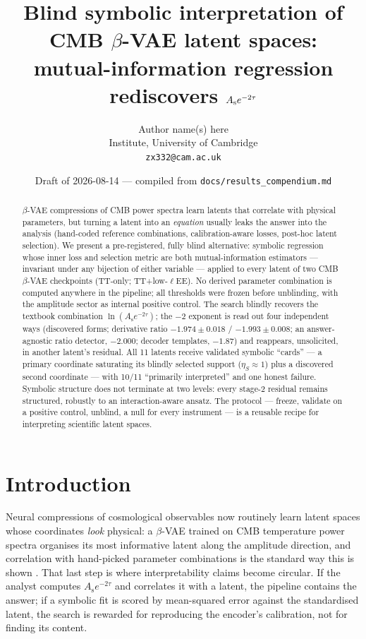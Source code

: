 \documentclass[twocolumn,10pt]{article}
\title{\bfseries Blind symbolic interpretation of CMB $\beta$-VAE latent spaces:\\
mutual-information regression rediscovers $\combo$}
\author{Author name(s) here\\
\small Institute, University of Cambridge\\
\small \texttt{zx332@cam.ac.uk}}
\date{Draft of 2026-08-14 --- compiled from \texttt{docs/results\_compendium.md}}
\newcommand{\As}{A_\mathrm{s}}
\newcommand{\etaS}{\eta_S}
\newcommand{\combo}{\As e^{-2\tau}}
\begin{document}
\maketitle

\begin{abstract}
\noindent
$\beta$-VAE compressions of CMB power spectra learn latents that correlate
with physical parameters, but turning a latent into an \emph{equation} usually
leaks the answer into the analysis (hand-coded reference combinations,
calibration-aware losses, post-hoc latent selection). We present a
pre-registered, fully blind alternative: symbolic regression whose inner loss
and selection metric are both mutual-information estimators --- invariant
under any bijection of either variable --- applied to every latent of two CMB
$\beta$-VAE checkpoints (TT-only; TT+low-$\ell$EE). No derived parameter
combination is computed anywhere in the pipeline; all thresholds were frozen
before unblinding, with the amplitude sector as internal positive control.
The search blindly recovers the textbook combination $\ln(\combo)$; the $-2$
exponent is read out four independent ways (discovered forms; derivative
ratio $-1.974\pm0.018$ / $-1.993\pm0.008$; an answer-agnostic ratio detector,
$-2.000$; decoder templates, $-1.87$) and reappears, unsolicited, in another
latent's residual. All 11 latents receive validated symbolic ``cards'' --- a
primary coordinate saturating its blindly selected support ($\etaS\approx1$)
plus a discovered second coordinate --- with 10/11 ``primarily interpreted''
and one honest failure. Symbolic structure does not terminate at two levels:
every stage-2 residual remains structured, robustly to an interaction-aware
ansatz. The protocol --- freeze, validate on a positive control, unblind,
a null for every instrument --- is a reusable recipe for interpreting
scientific latent spaces.
\end{abstract}

\section{Introduction}
\label{sec:intro}

Neural compressions of cosmological observables now routinely learn latent
spaces whose coordinates \emph{look} physical: a $\beta$-VAE trained on CMB
temperature power spectra organises its most informative latent along the
amplitude direction, and correlation with hand-picked parameter combinations is
the standard way this is shown \citep{piras2025}. That last step is where
interpretability claims become circular. If the analyst computes
$\combo$ and correlates it with a latent, the pipeline contains the answer; if
a symbolic fit is scored by mean-squared error against the standardised latent,
the search is rewarded for reproducing the encoder's calibration, not for
finding its content.
\end{document}
